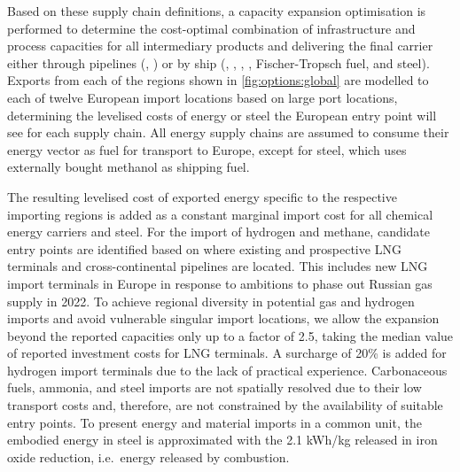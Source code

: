 
Based on these supply chain definitions, a capacity expansion optimisation is
performed to determine the cost-optimal combination of infrastructure and
process capacities for all intermediary products and delivering the final
carrier either through pipelines (, ) or by ship
(, , , , Fischer-Tropsch fuel,
and steel). Exports from each of the regions shown in \cref{fig:options:global}
are modelled to each of twelve European import locations based on large port
locations, determining the levelised costs of energy or steel the European entry
point will see for each supply chain. All energy supply chains are assumed to
consume their energy vector as fuel for transport to Europe, except for steel,
which uses externally bought methanol as shipping fuel.


The resulting levelised cost of exported energy specific to the respective
importing regions is added as a constant marginal import cost for all
chemical energy carriers and steel. For the import of hydrogen and methane,
candidate entry points are identified based on where existing and prospective
LNG terminals and cross-continental pipelines are located. This includes new LNG
import terminals in Europe in response to ambitions to phase out Russian gas
supply in 2022.
\cite{instituteforenergyeconomicsandfinancialanalysisEuropeanLNG2023} To achieve
regional diversity in potential gas and hydrogen imports and avoid vulnerable
singular import locations, we allow the expansion beyond the reported capacities
only up to a factor of 2.5, taking the median value of reported investment costs
for LNG terminals.\cite{GlobalGas2022} A surcharge of 20\% is added for hydrogen
import terminals due to the lack of practical experience. Carbonaceous fuels,
ammonia, and steel imports are not spatially resolved due to their low transport
costs and, therefore, are not constrained by the availability of suitable entry
points. To present energy and material imports in a common unit, the embodied
energy in steel is approximated with the 2.1 kWh/kg released in iron oxide
reduction, i.e.~energy released by combustion.\cite{kuhnIronRecyclable2022}


